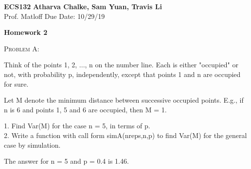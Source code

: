 \documentclass[12pt]{article}
\newenvironment{statement}[1]
{\begin{mdframed}[linewidth=0.6pt]
        \textsc{ #1:}

}
    {\end{mdframed}}
\begin{document}
\noindent
\textbf{ECS132} \hfill \textbf{Atharva Chalke, Sam Yuan, Travis Li} \\
\normalsize Prof. Matloff \hfill Due Date: 10/29/19 \\


\begin{center}
\textbf{Homework 2}
\end{center}

\begin{statement}{Problem A}
Think of the points 1, 2, ..., n on the number line. Each is either "occupied" or not, with probability p, independently, except that points 1 and n are occupied for sure.

Let M denote the minimum distance between successive occupied points. E.g., if n is 6 and points 1, 5 and 6 are occupied, then M = 1.

1. Find Var(M) for the case n = 5, in terms of p.\\
2. Write a function with call form
simA(nreps,n,p)
to find Var(M) for the general case by simulation.

The answer for n = 5 and p = 0.4 is 1.46.
\end{statement}

\end{document}
